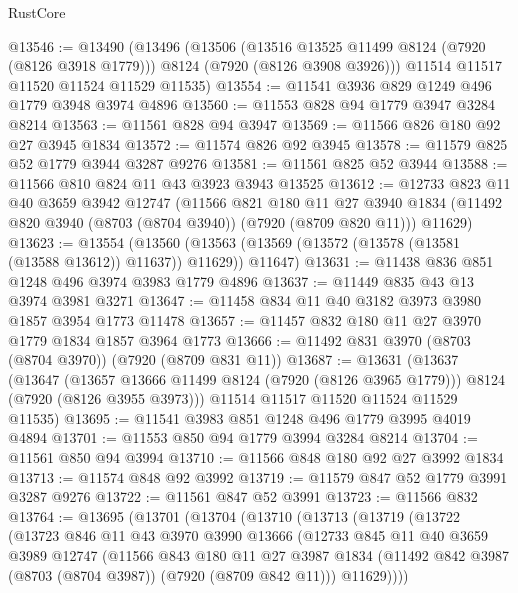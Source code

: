 \begin{lexlean}{RustCore}
\begin{coremodule}
@13546 := @13490
    (@13496
      (@13506
        (@13516 @13525 @11499 @8124 (@7920 (@8126 @3918 @1779)))
        @8124
        (@7920 (@8126 @3908 @3926)))
      @11514
      @11517
      @11520
      @11524
      @11529
      @11535)
@13554 := @11541 @3936 @829 @1249 @496 @1779 @3948 @3974 @4896
@13560 := @11553 @828 @94 @1779 @3947 @3284 @8214
@13563 := @11561 @828 @94 @3947
@13569 := @11566 @826 @180 @92 @27 @3945 @1834
@13572 := @11574 @826 @92 @3945
@13578 := @11579 @825 @52 @1779 @3944 @3287 @9276
@13581 := @11561 @825 @52 @3944
@13588 := @11566 @810 @824 @11 @43 @3923 @3943 @13525
@13612 := @12733
    @823
    @11
    @40
    @3659
    @3942
    @12747
    (@11566
      @821
      @180
      @11
      @27
      @3940
      @1834
      (@11492 @820 @3940 (@8703 (@8704 @3940)) (@7920 (@8709 @820 @11)))
      @11629)
@13623 := @13554
    (@13560 (@13563 (@13569 (@13572 (@13578 (@13581 (@13588 @13612)) @11637)) @11629)) @11647)
@13631 := @11438 @836 @851 @1248 @496 @3974 @3983 @1779 @4896
@13637 := @11449 @835 @43 @13 @3974 @3981 @3271
@13647 := @11458 @834 @11 @40 @3182 @3973 @3980 @1857 @3954 @1773 @11478
@13657 := @11457 @832 @180 @11 @27 @3970 @1779 @1834 @1857 @3964 @1773
@13666 := @11492 @831 @3970 (@8703 (@8704 @3970)) (@7920 (@8709 @831 @11))
@13687 := @13631
    (@13637
      (@13647
        (@13657 @13666 @11499 @8124 (@7920 (@8126 @3965 @1779)))
        @8124
        (@7920 (@8126 @3955 @3973)))
      @11514
      @11517
      @11520
      @11524
      @11529
      @11535)
@13695 := @11541 @3983 @851 @1248 @496 @1779 @3995 @4019 @4894
@13701 := @11553 @850 @94 @1779 @3994 @3284 @8214
@13704 := @11561 @850 @94 @3994
@13710 := @11566 @848 @180 @92 @27 @3992 @1834
@13713 := @11574 @848 @92 @3992
@13719 := @11579 @847 @52 @1779 @3991 @3287 @9276
@13722 := @11561 @847 @52 @3991
@13723 := @11566 @832
@13764 := @13695
    (@13701
      (@13704
        (@13710
          (@13713
            (@13719
              (@13722
                (@13723
                  @846
                  @11
                  @43
                  @3970
                  @3990
                  @13666
                  (@12733
                    @845
                    @11
                    @40
                    @3659
                    @3989
                    @12747
                    (@11566
                      @843
                      @180
                      @11
                      @27
                      @3987
                      @1834
                      (@11492 @842 @3987 (@8703 (@8704 @3987)) (@7920 (@8709 @842 @11)))
                      @11629))))

\end{coremodule}
\end{lexlean}
